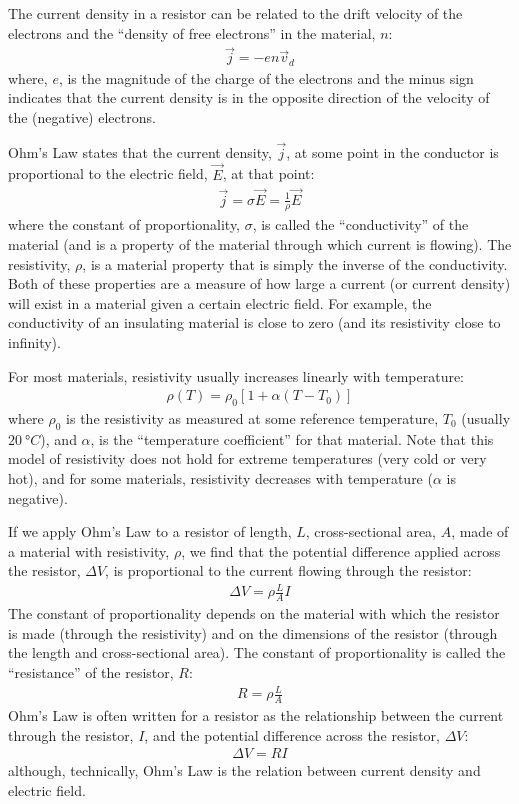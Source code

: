 \begin{chapterSummary}
The current density in a resistor can be related to the drift velocity of the electrons and the ``density of free electrons'' in the material, $n$:
\begin{align*}
\vec j = -en\vec v_d
\end{align*}
where, $e$,  is the magnitude of the charge of the electrons and the minus sign indicates that the current density is in the opposite direction of the velocity of the (negative) electrons.

Ohm's Law states that the current density, $\vec j$, at some point in the conductor is proportional to the electric field, $\vec E$, at that point:
\begin{align*}
\vec j=\sigma \vec E=\frac{1}{\rho}\vec E
\end{align*}
where the constant of proportionality, $\sigma$, is called the ``conductivity'' of the material (and is a property of the material through which current is flowing). The resistivity, $\rho$, is a material property that is simply the inverse of the conductivity. Both of these properties are a measure of how large a current (or current density) will exist in a material given a certain electric field. For example, the conductivity of an insulating material is close to zero (and its resistivity close to infinity).

For most materials, resistivity usually increases linearly with temperature:
\begin{align*}
\rho(T)=\rho_0[1+\alpha(T-T_0)]
\end{align*} 
where $\rho_0$ is the resistivity as measured at some reference temperature, $T_0$ (usually $\SI{20}{\degree C}$), and $\alpha$, is the ``temperature coefficient'' for that material. Note that this model of resistivity does not hold for extreme temperatures (very cold or very hot), and for some materials, resistivity decreases with temperature ($\alpha$ is negative). 

If we apply Ohm's Law to a resistor of length, $L$, cross-sectional area, $A$, made of a material with resistivity, $\rho$, we find that the potential difference applied across the resistor, $\Delta V$, is proportional to the current flowing through the resistor:
\begin{align*}
\Delta V =\rho \frac{L}{A} I
\end{align*}
The constant of proportionality depends on the material with which the resistor is made (through the resistivity) and on the dimensions of the resistor (through the length and cross-sectional area). The constant of proportionality is called the ``resistance'' of the resistor, $R$:
\begin{align*}
R=\rho \frac{L}{A}
\end{align*}
Ohm's Law is often written for a resistor as the relationship between the current through the resistor, $I$, and the potential difference across the resistor, $\Delta V$:
\begin{align*}
\Delta V = RI
\end{align*}
although, technically, Ohm's Law is the relation between current density and electric field.


\end{chapterSummary}
